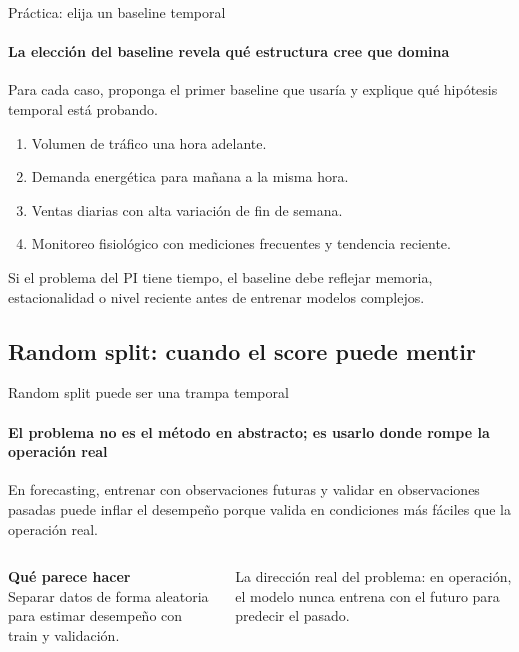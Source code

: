 \documentclass[aspectratio=169,11pt]{beamer}  %
\newcommand{\Lg}{\fontsize{16}{20}\selectfont}
\newcommand{\bigstate}[1]{\begin{center}\Lg #1\end{center}}
\begin{document}
\begin{frame}{Práctica: elija un baseline temporal}
\framesubtitle{La elección del baseline revela qué estructura cree que domina}
\begin{taskbox}
Para cada caso, proponga el primer baseline que usaría y explique qué hipótesis temporal está probando.
\end{taskbox}
\begin{enumerate}
\item Volumen de tráfico una hora adelante.
\item Demanda energética para mañana a la misma hora.
\item Ventas diarias con alta variación de fin de semana.
\item Monitoreo fisiológico con mediciones frecuentes y tendencia reciente.
\end{enumerate}
Si el problema del PI tiene tiempo, el baseline debe reflejar memoria, estacionalidad o nivel reciente antes de entrenar modelos complejos.
\end{frame}

\subsection{Random split: cuando el score puede mentir}

\begin{frame}{Random split puede ser una trampa temporal}
\framesubtitle{El problema no es el método en abstracto; es usarlo donde rompe la operación real}
\bigstate{En forecasting, entrenar con observaciones futuras y validar en observaciones pasadas puede inflar el desempeño porque valida en condiciones más fáciles que la operación real.}
\begin{columns}[T]
\textbf{Qué parece hacer}\\
Separar datos de forma aleatoria para estimar desempeño con train y validación.
\vspace{0.3em}
\begin{rulebox}
La dirección real del problema: en operación, el modelo nunca entrena con el futuro para predecir el pasado.
\end{rulebox}
\end{columns}
\end{frame}
\end{document}
